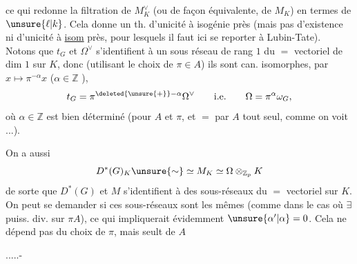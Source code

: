 ce qui redonne la filtration de $M_K^{\vee}$ (ou de façon équivalente, de $M_K$) en termes de $\unsure{\ell|k}$.
Cela donne un th. d'unicité à isogénie près (mais pas d'existence ni d'unicité à \uline{isom} près, pour lesquels il faut ici se reporter à Lubin-Tate). Notons que $t_G$ et $\Omega^{\vee}$ s'identifient à un sous réseau de rang $1$ du $=$ vectoriel de dim $1$ sur $K$, donc (utilisant le choix de $\pi\in A$) ils sont can. isomorphes,  par  $x\longmapsto\pi^{-\alpha}x$ ($\alpha\in\mathbb Z$ ),
\[
t_G=\pi^{\deleted{\unsure{+}}-\alpha}\Omega^{\vee}\qquad\text{i.e.}\qquad\Omega=\pi^\alpha\omega_G,
\]
 où $\alpha\in\mathbb Z$ est bien déterminé (pour $A$ et $\pi$, et $=$ par $A$ tout seul, comme on voit ...).

On a aussi
\[
D^*(G)_K\unsure{\sim}\simeq M_K\simeq\Omega\otimes_{\mathbb Z_p}K
\]
de sorte que $D^*(G)$ et $M$ s'identifient à des sous-réseaux du $=$ vectoriel sur $K$. On peut se demander si ces sous-réseaux sont les mêmes (comme dans le cas où $\exists$ puiss. div. sur $\pi A$), ce qui impliquerait évidemment $\unsure{\alpha'|\alpha}=0$.
Cela ne dépend pas du choix de $\pi$, mais seult de $A$

.....-
